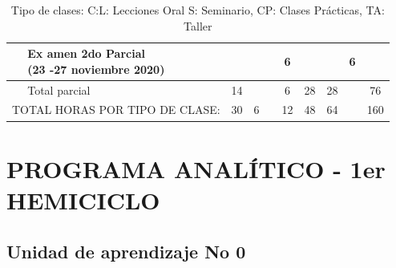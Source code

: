 \documentclass[a4pa<per,12pt,spanish]{article}
\begin{document}
\begin{table}[H]
\begin{tabular}[H]{|p{0.5cm}|p{8cm}|c|c|c|c|c||c||c|c|}
                 &\makecell{Ex amen 2do Parcial\\ (23 -27 noviembre 2020)} & & & &6 &  & & 6 \\\hline
  \rowcolor{blue!10}

                    &Total parcial &14 & & &6 &28  &28 & &76 \\\hline

  \multicolumn{2}{|l|}{TOTAL HORAS POR TIPO DE CLASE:} &30&6 & &12  &48 &64 & &160 \\ \hline
  
\end{tabular}
\caption{Tipo de clases: C:\@Conferencia L: Lecciones Oral S: Seminario, CP: Clases Prácticas, TA: Taller}
\end{table}




\begingroup

\section{PROGRAMA ANALÍTICO - 1er HEMICICLO}
\subsection{Unidad de aprendizaje No 0}
\label{sec:unid-de-aprend0}
\end{document}

